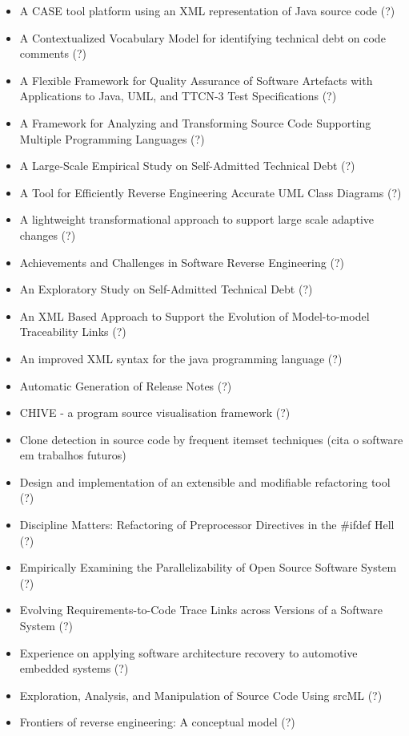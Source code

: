 \begin{itemize}
\item A CASE tool platform using an XML representation of Java source code (?)
\item A Contextualized Vocabulary Model for identifying technical debt on code comments (?)
\item A Flexible Framework for Quality Assurance of Software Artefacts with Applications to Java, UML, and TTCN-3 Test Specifications (?)
\item A Framework for Analyzing and Transforming Source Code Supporting Multiple Programming Languages (?)
\item A Large-Scale Empirical Study on Self-Admitted Technical Debt (?)
\item A Tool for Efficiently Reverse Engineering Accurate UML Class Diagrams (?)
\item A lightweight transformational approach to support large scale adaptive changes (?)
\item Achievements and Challenges in Software Reverse Engineering (?)
\item An Exploratory Study on Self-Admitted Technical Debt (?)
\item An XML Based Approach to Support the Evolution of Model-to-model Traceability Links (?)
\item An improved XML syntax for the java programming language (?)
\item Automatic Generation of Release Notes (?)
\item CHIVE - a program source visualisation framework (?)
\item Clone detection in source code by frequent itemset techniques (cita o software em trabalhos futuros)
\item Design and implementation of an extensible and modifiable refactoring tool (?)
\item Discipline Matters: Refactoring of Preprocessor Directives in the \#ifdef Hell (?)
\item Empirically Examining the Parallelizability of Open Source Software System (?)
\item Evolving Requirements-to-Code Trace Links across Versions of a Software System (?)
\item Experience on applying software architecture recovery to automotive embedded systems (?)
\item Exploration, Analysis, and Manipulation of Source Code Using srcML (?)
\item Frontiers of reverse engineering: A conceptual model (?)

\end{itemize}
